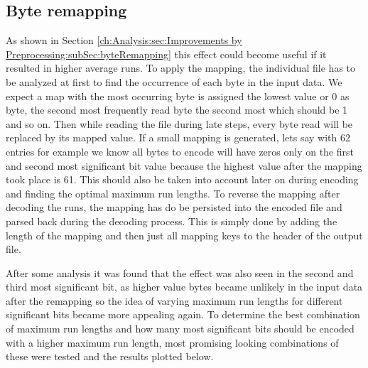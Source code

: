 \subsection{Byte remapping}
\par{
As shown in Section \ref{ch:Analysis:sec:Improvements by Preprocessing:subSec:byteRemapping} this effect could become useful if it resulted in higher average runs. To apply the mapping, the individual file has to be analyzed at first to find the occurrence of each byte in the input data. We expect a map with the most occurring byte is assigned the lowest value or 0 as byte, the second most frequently read byte the second most which should be 1 and so on. Then while reading the file during late steps, every byte read will be replaced by its mapped value. If a small mapping is generated, lets say with 62 entries for example we know all bytes to encode will have zeros only on the first and second most significant bit value because the highest value after the mapping took place is 61. This should also be taken into account later on during encoding and finding the optimal maximum run lengths.
To reverse the mapping after decoding the runs, the mapping has do be persisted into the encoded file and parsed back during the decoding process. This is simply done by adding the length of the mapping and then just all mapping keys to the header of the output file. 
}
\par{
After some analysis it was found that the effect was also seen in the second and third most significant bit, as higher value bytes became unlikely in the input data after the remapping so the idea of varying maximum run lengths for different significant bits became more appealing again. To determine the best combination of maximum run lengths and how many most significant bits should be encoded with a higher maximum run length, most promising looking combinations of these were tested and the results plotted below.
}
